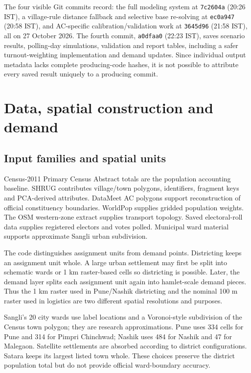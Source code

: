 \documentclass[11pt,a4paper,oneside]{report}
\newcommand{\source}[1]{\par\nopagebreak[4]{\footnotesize\color{teal}Evidence: #1.}\par}
\begin{document}
The four visible Git commits record: the full modeling system at \texttt{7c2604a} (20:26 IST), a village-rule distance fallback and selective base re-solving at \texttt{ec0a947} (20:58 IST), and AC-specific calibration/validation work at \texttt{3645d96} (21:58 IST), all on 27 October 2026. The fourth commit, \texttt{a0dfaa0} (22:23 IST), saves scenario results, polling-day simulations, validation and report tables, including a safer turnout-weighting implementation and demand updates. Since individual output metadata lacks complete producing-code hashes, it is not possible to attribute every saved result uniquely to a producing commit.
\source{[S7]--[S16]}

\chapter{Data, spatial construction and demand}
\section{Input families and spatial units}
Census-2011 Primary Census Abstract totals are the population accounting baseline. SHRUG contributes village/town polygons, identifiers, fragment keys and PCA-derived attributes. DataMeet AC polygons support reconstruction of official constituency boundaries. WorldPop supplies gridded population weights. The OSM western-zone extract supplies transport topology. Saved electoral-roll data supplies registered electors and votes polled. Municipal ward material supports approximate Sangli urban subdivision.

The code distinguishes assignment units from demand points. Districting keeps an assignment unit whole. A large urban settlement may first be split into schematic wards or 1 km raster-based cells so districting is possible. Later, the demand layer splits each assignment unit again into hamlet-scale demand pieces. Thus the 1 km raster used in Pune/Nashik districting and the nominal 100 m raster used in logistics are two different spatial resolutions and purposes.

Sangli's 20 city wards use label locations and a Voronoi-style subdivision of the Census town polygon; they are research approximations. Pune uses 334 cells for Pune and 314 for Pimpri Chinchwad; Nashik uses 484 for Nashik and 47 for Malegaon. Satellite settlements are absorbed according to district configurations. Satara keeps its largest listed town whole. These choices preserve the district population total but do not provide official ward-boundary accuracy.
\source{[S4], [S7]}
\end{document}

